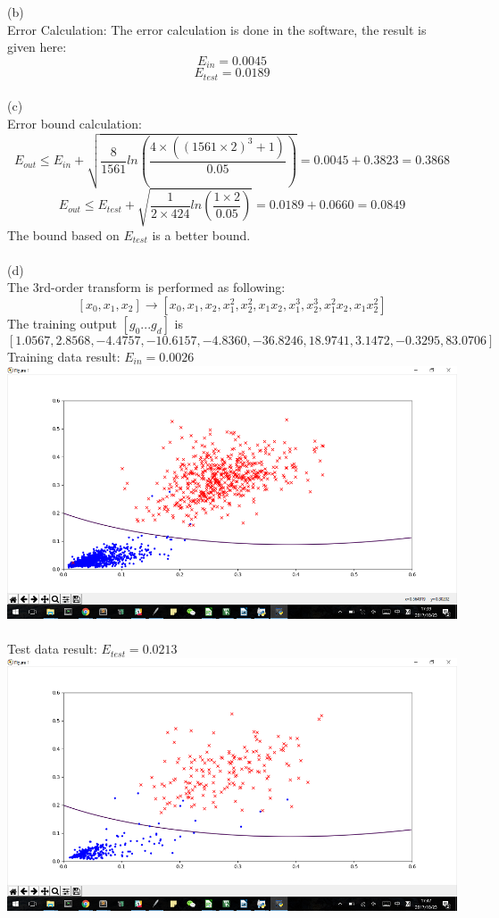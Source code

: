 \documentclass[12pt]{article}
\begin{document}
(b)\\%
Error Calculation:
The error calculation is done in the software, the result is given here:\\
$$E_{in}=0.0045$$
$$E_{test}=0.0189$$\\
(c)\\%
Error bound calculation:
$$E_{out} \leq  E_{in}+\sqrt{\frac{8}{1561}ln(\frac{4\times ((1561\times 2)^{3}+1)}{0.05})} = 0.0045+0.3823 = 0.3868$$
$$E_{out} \leq  E_{test}+\sqrt{\frac{1}{2\times424}ln(\frac{1\times 2}{0.05})} = 0.0189+0.0660 = 0.0849$$
The bound based on $E_{test}$ is a better bound.\\\\
(d)\\%
The 3rd-order transform is performed as following:
$$[x_0,x_1,x_2]\longrightarrow [x_0, x_1, x_2, x_1^2 ,x_2^2, x_1x_2, x_1^3, x_2^3, x_1^2x_2, x_1x_2^2]$$
The training output $[g_0...g_d]$ is $$[1.0567, 2.8568, -4.4757, -10.6157, -4.8360, -36.8246, 18.9741, 3.1472, -0.3295, 83.0706]$$
Training data result: $E_{in}=0.0026$\\
\includegraphics[scale=0.6]{image/3rd_train}\\\\
Test data result: $E_{test}=0.0213$\\
\includegraphics[scale=0.6]{image/3rd_test}\\\\
\end{document}
